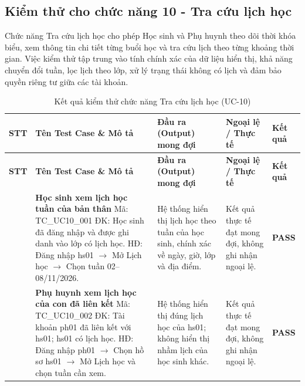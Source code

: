 \subsection{Kiểm thử cho chức năng 10 - Tra cứu lịch học}

\hspace*{1em}Chức năng Tra cứu lịch học cho phép Học sinh và Phụ huynh theo dõi thời khóa biểu, xem thông tin chi tiết từng buổi học và tra cứu lịch theo từng khoảng thời gian. Việc kiểm thử tập trung vào tính chính xác của dữ liệu hiển thị, khả năng chuyển đổi tuần, lọc lịch theo lớp, xử lý trạng thái không có lịch và đảm bảo quyền riêng tư giữa các tài khoản.

\vspace{0.4em}
\begin{longtable}{|>{\centering\arraybackslash}p{0.8cm}|>{\raggedright\arraybackslash}p{4.6cm}|>{\raggedright\arraybackslash}p{3.8cm}|>{\raggedright\arraybackslash}p{3.8cm}|>{\centering\arraybackslash}p{1.5cm}|}
\caption{Kết quả kiểm thử chức năng Tra cứu lịch học (UC-10)}\label{tab:test-uc10}\\
\hline
\textbf{STT} & \textbf{Tên Test Case \& Mô tả} & \textbf{Đầu ra (Output) mong đợi} & \textbf{Ngoại lệ / Thực tế} & \textbf{Kết quả} \\
\hline
\endfirsthead
\hline
\textbf{STT} & \textbf{Tên Test Case \& Mô tả} & \textbf{Đầu ra (Output) mong đợi} & \textbf{Ngoại lệ / Thực tế} & \textbf{Kết quả} \\
\hline
\endhead
1 & \textbf{Học sinh xem lịch học tuần của bản thân}\newline
Mã: TC\_UC10\_001\newline
ĐK: Học sinh đã đăng nhập và được ghi danh vào lớp có lịch học.\newline
HĐ: Đăng nhập hs01 $\rightarrow$ Mở Lịch học $\rightarrow$ Chọn tuần 02--08/11/2026. &
Hệ thống hiển thị lịch học theo tuần của học sinh, chính xác về ngày, giờ, lớp và địa điểm. &
Kết quả thực tế đạt mong đợi, không ghi nhận ngoại lệ. & \textbf{PASS} \\
\hline
2 & \textbf{Phụ huynh xem lịch học của con đã liên kết}\newline
Mã: TC\_UC10\_002\newline
ĐK: Tài khoản ph01 đã liên kết với hs01; hs01 có lịch học.\newline
HĐ: Đăng nhập ph01 $\rightarrow$ Chọn hồ sơ hs01 $\rightarrow$ Mở Lịch học và chọn tuần cần xem. &
Hệ thống hiển thị đúng lịch học của hs01; không hiển thị nhầm lịch của học sinh khác. &
Kết quả thực tế đạt mong đợi, không ghi nhận ngoại lệ. & \textbf{PASS} \\

\end{longtable}
